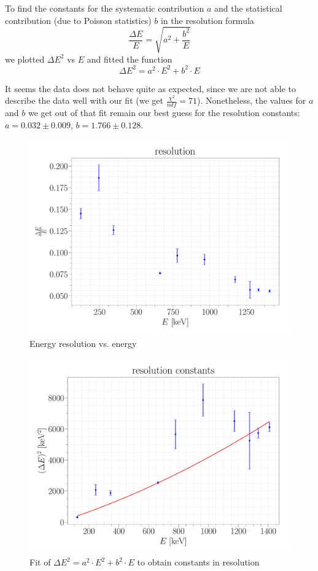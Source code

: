 \documentclass[a4paper,12pt]{article}
\begin{document}
To find the constants for the systematic contribution $a$ and the statistical contribution (due to Poisson statistics) $b$ in the resolution formula 
\begin{equation}
	\frac{\Delta E}{E} = \sqrt{a^2+ \frac{b^2}{E}}
\end{equation}
we plotted $\Delta E^2$ vs $E$ and fitted the function 
\begin{equation}
	\Delta E^2 = a^2 \cdot E^2 + b^2 \cdot E
\end{equation}

It seems the data does not behave quite as expected, since we are not able to describe the data well with our fit (we get $\frac{\chi^2}{ndf} = 71$). Nonetheless, the values for $a$ and $b$ we get out of that fit remain our best guess for the resolution constants: $a = 0.032\pm0.009$, $b = 1.766\pm0.128$.

\begin{figure}[H]
\centering
\includegraphics[scale=0.25]{../Figures/resolution.pdf}
\caption{Energy resolution vs. energy}
\label{resolution}
\end{figure}


\begin{figure}[H]
\centering
\includegraphics[scale=0.25]{../Figures/resolution constants.pdf}
\caption{Fit of $\Delta E^2 = a^2 \cdot E^2 + b^2 \cdot E$ to obtain constants in resolution}
\label{resolutionFit}
\end{figure}
\end{document}
